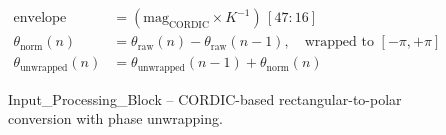 \begin{figure}[H]
{\begin{tikzpicture}[
    node distance=1.2cm and 2.0cm,
    >=Stealth, thick, font=\sffamily
]
\end{tikzpicture}%
}

\vspace{3mm}
\begin{align*}
    \text{envelope} &= (\text{mag}_{\text{CORDIC}} \times K^{-1})\,[47\!:\!16] \\
    \theta_{\text{norm}}(n) &= \theta_{\text{raw}}(n) - \theta_{\text{raw}}(n\!-\!1), \quad \text{wrapped to } [-\pi, +\pi] \\
    \theta_{\text{unwrapped}}(n) &= \theta_{\text{unwrapped}}(n\!-\!1) + \theta_{\text{norm}}(n)
\end{align*}

\caption{Input\_Processing\_Block -- CORDIC-based rectangular-to-polar conversion with phase unwrapping.}
\label{fig:input_processing}
\end{figure}
